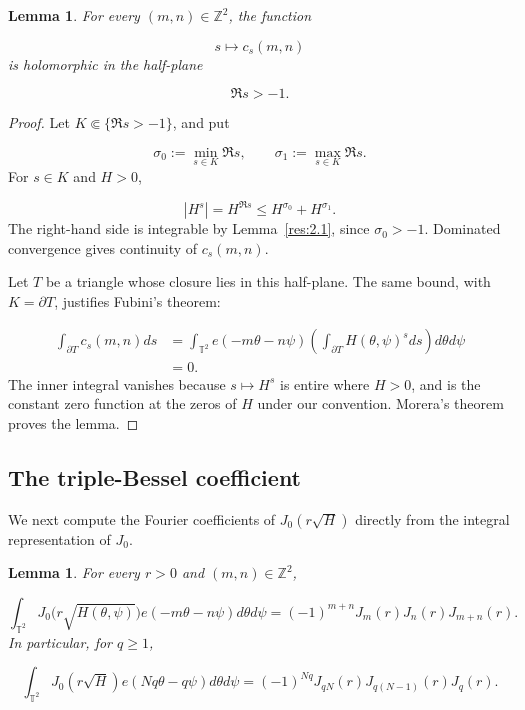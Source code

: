 \documentclass[11pt]{article}
\theoremstyle{plain}
\newtheorem{lemma}[theorem]{Lemma}
\theoremstyle{definition}
\theoremstyle{remark}
\begin{document}
\begin{lemma}\label{res:3.1}
For every $(m,n) \in \mathbb{Z}^{2}$, the function

\[
  s \longmapsto c_s(m,n)
\]
is holomorphic in the half-plane

\[
  \Re s > -1 .
\]
\end{lemma}

\begin{proof}
Let $K \Subset \{\Re s > -1\}$, and put

\[
  \sigma_{0} := \min_{s \in K} \Re s , \qquad  \sigma_{1} := \max_{s \in K} \Re s .
\]
For $s \in K$ and $H > 0$,

\[
  |H^s| = H^{\Re s} \le H^{\sigma_{0}} + H^{\sigma_{1}} .
\]
The right-hand side is integrable by Lemma~\ref{res:2.1}, since $\sigma_{0} > -1$. Dominated convergence gives continuity of $c_s(m,n)$.

Let $T$ be a triangle whose closure lies in this half-plane. The same bound, with $K = \partial T$, justifies Fubini's theorem:

\begin{align*}
  \int_{\partial T} c_s(m,n) ds &= \int_{\mathbb{T}^{2}} e(-m\theta - n\psi ) \left( \int_{\partial T} H(\theta ,\psi )^s ds \right) d\theta d\psi \\
  &= 0 .
\end{align*}
The inner integral vanishes because $s \mapsto H^s$ is entire where $H > 0$, and is the constant zero function at the zeros of $H$ under our convention. Morera's theorem proves the lemma.
\end{proof}

\subsection{The triple-Bessel coefficient}\label{sub:3.2}
We next compute the Fourier coefficients of $J_{0}(r\sqrt{H})$ directly from the integral representation of $J_{0}$.

\begin{lemma}\label{res:3.2}
For every $r > 0$ and $(m,n) \in \mathbb{Z}^{2}$,

\begin{equation}\label{eq:triple}
  \int_{\mathbb{T}^{2}} J_{0}\big( r\sqrt{H(\theta ,\psi )} \big) e(-m\theta - n\psi ) d\theta d\psi = (-1)^{m+n} J_m(r) J_n(r) J_{m+n}(r) .
\end{equation}
In particular, for $q \ge 1$,

\begin{equation}\label{eq:tripleq}
  \int_{\mathbb{T}^{2}} J_{0}(r\sqrt{H}) e(Nq\theta - q\psi ) d\theta d\psi = (-1)^{Nq} J_{qN}(r) J_{q(N-1)}(r) J_q(r) .
\end{equation}
\end{lemma}
\end{document}

